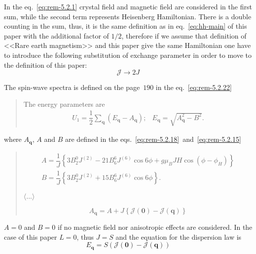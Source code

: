     In the eq.~\eqref{eq:rem-5.2.1} crystal field and magnetic field are considered in the first sum, while the second term represents Heisenberg Hamiltonian.
    There is a double counting in the sum, thus, it is the same definition as in eq.~\eqref{eq:hh-main} of this paper 
    with the additional factor of $1/2$, therefore if we assume that definition of <<Rare earth magnetism>> and this paper give the same Hamiltonian one have to 
    introduce the following substitution of exchange parameter in order to move to the definition of this paper:
    \begin{equation}
        \mathcal{J} \rightarrow 2J \label{eq:rem-sub}
    \end{equation}

    The spin-wave spectra is defined on the page~$190$ in the eq.~\eqref{eq:rem-5.2.22}
    \begin{quote}
        The energy parameters are
        \begin{equation}
            \begin{matrix}
                U_1 = \dfrac{1}{2}\sum_{\mathbf{q}}(E_{\mathbf{q}} - A_{\mathbf{q}}); & E_{\mathbf{q}} = \sqrt{A_{\mathbf{q}}^2 - B^2}.
            \end{matrix}
            \label{eq:rem-5.2.22} \tag{5.2.22}
        \end{equation}
    \end{quote}
    where $A_{\mathbf{q}}$, $A$ and $B$ are defined in the eqs.~\eqref{eq:rem-5.2.18}~and~\eqref{eq:rem-5.2.15}
    \begin{quote}
        \begin{equation}
            \begin{matrix}
                A = \dfrac{1}{J}\left\{3B^0_2J^{(2)} - 21B^6_6J^{(6)}\cos6\phi + g\mu_BJH\cos(\phi - \phi_H)\right\}\\
                B = \dfrac{1}{J}\left\{3B^0_2J^{(2)} + 15B^6_6J^{(6)}\cos6\phi\right\}.
            \end{matrix}
            \label{eq:rem-5.2.15} \tag{5.2.15}
        \end{equation}

        $\langle ... \rangle$

        
        \begin{equation}
            A_{\mathbf{q}} = A + J\left\{\mathcal{J}(\mathbf{0}) - \mathcal{J}(\mathbf{q})\right\}
            \label{eq:rem-5.2.18} \tag{5.2.18}
        \end{equation}
    \end{quote}
    $A = 0$ and $B = 0$ if no magnetic field nor anisotropic effects are considered. In the case of this paper $L = 0$, thus $J = S$ and the equation for the dispersion law is
    \begin{equation}
        E_{\mathbf{q}} = S\left(\mathcal{J}(\mathbf{0}) - \mathcal{J}(\mathbf{q})\right)
    \end{equation}

